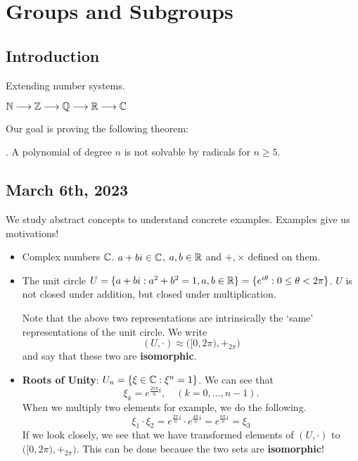 \chapter{Groups and Subgroups}

\section*{Introduction}


Extending number systems.
\begin{center}
    \(\mathbb{N} \longrightarrow \mathbb{Z} \longrightarrow \mathbb{Q} \longrightarrow \mathbb{R} \longrightarrow \mathbb{C}\)
\end{center}

Our goal is proving the following theorem:

\thm. A polynomial of degree \(n\) is not solvable by radicals for \(n \geq 5\).

\section*{March 6th, 2023}

We study abstract concepts to understand concrete examples. Examples give us motivations!

\begin{itemize}
    \item Complex numbers \(\mathbb{C}\). \(a + bi \in \mathbb{C}\), \(a, b \in \mathbb{R}\) and \(+, \times\) defined on them.
    \item The unit circle \(U = \{a + bi : a^2 + b^2 = 1, a, b \in \mathbb{R}\} = \{e^{i\theta} : 0 \leq \theta < 2\pi\}\). \(U\) is not closed under addition, but closed under multiplication.

          Note that the above two representations are intrinsically the `same' representations of the unit circle. We write
          \[
              (U, \cdot) \approx \bigl([0, 2\pi), +_{2\pi}\bigr)
          \]
          and say that these two are \textbf{isomorphic}.
    \item \textbf{Roots of Unity}: \(U_n = \{\xi \in \mathbb{C} : \xi^n = 1\}\). We can see that
          \[
              \xi_k = e^{\frac{2\pi k}{n}i}, \quad (k = 0, \dots, n - 1).
          \]
          When we multiply two elements for example, we do the following.
          \[
              \xi_1 \cdot \xi_2 = e^{\frac{2\pi}{n}i} \cdot e^{\frac{4\pi}{n}i} = e^{\frac{6\pi}{n}i} = \xi_3
          \]
          If we look closely, we see that we have transformed elements of \((U, \cdot)\) to \(\bigl([0, 2\pi), +_{2\pi}\bigr)\). This can be done because the two sets are \textbf{isomorphic}!
\end{itemize}

\pagebreak
